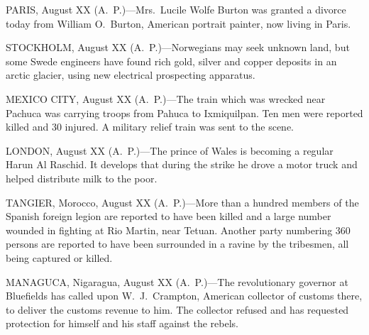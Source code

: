 \documentclass{newspaper1920}
\begin{document}
\begin{multicols}{3}



\noindent
PARIS, August XX (A.~P.)---Mrs.~Lucile Wolfe Burton was granted a
divorce today from William O.\ Burton, American portrait painter, now
living in Paris.

\halfrule


\noindent
STOCKHOLM, August XX (A.~P.)---Norwegians may seek unknown land, but
some Swede engineers have found rich gold, silver and copper deposits
in an arctic glacier, using new electrical prospecting apparatus.

\halfrule


\noindent
MEXICO CITY, August XX (A.~P.)---The train which was wrecked near
Pachuca was carrying troops from Pahuca to Ixmiquilpan.  Ten men were
reported killed and 30 injured.  A military relief train was sent to
the scene.

\halfrule


\noindent
LONDON, August XX (A.~P.)---The prince of Wales is becoming a regular
Harun Al Raschid.  It develops that during the strike he drove a motor
truck and helped distribute milk to the poor.

\halfrule


\noindent
TANGIER, Morocco, August XX (A.~P.)---More than a hundred members of
the Spanish foreign legion are reported to have been killed and a
large number wounded in fighting at Rio Martin, near Tetuan.  Another
party numbering 360 persons are reported to have been surrounded in a
ravine by the tribesmen, all being captured or killed.

\halfrule


\noindent
MANAGUCA, Nigaragua, August XX (A.~P.)---The revolutionary governor at
Bluefields has called upon W.~J.~Crampton, American collector of
customs there, to deliver the customs revenue to him.  The collector
refused and has requested protection for himself and his staff against
the rebels.

\fullrule


\end{multicols}
\end{document}

